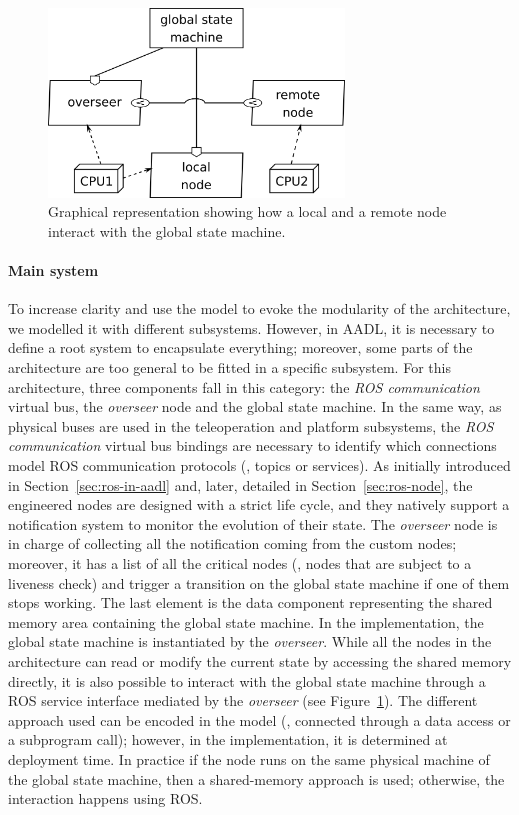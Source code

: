 \begin{figure}[t]
\centering
\includegraphics[width=0.7\textwidth]{gfx/pmk/overseer}
\caption{Graphical representation showing how a local and a remote node interact with the global state machine.}
\label{fig:pmk-gsm}
\end{figure}

\paragraph{Main system} To increase clarity and use the model to evoke the modularity of the architecture, we modelled it with different subsystems. However, in AADL, it is necessary to define a root system to encapsulate everything; moreover, some parts of the architecture are too general to be fitted in a specific subsystem. For this architecture, three components fall in this category: the \textit{ROS communication} virtual bus, the \textit{overseer} node and the global state machine. In the same way, as physical buses are used in the teleoperation and platform subsystems, the \textit{ROS communication} virtual bus bindings are necessary to identify which connections model ROS communication protocols (\ie, topics or services). As initially introduced in Section~\ref{sec:ros-in-aadl} and, later, detailed in Section~\ref{sec:ros-node}, the engineered nodes are designed with a strict life cycle, and they natively support a notification system to monitor the evolution of their state. The \textit{overseer} node is in charge of collecting all the notification coming from the custom nodes; moreover, it has a list of all the critical nodes (\ie, nodes that are subject to a liveness check) and trigger a transition on the global state machine if one of them stops working. The last element is the data component representing the shared memory area containing the global state machine. In the implementation, the global state machine is instantiated by the \textit{overseer}. While all the nodes in the architecture can read or modify the current state by accessing the shared memory directly, it is also possible to interact with the global state machine through a ROS service interface mediated by the \textit{overseer} (see Figure~\ref{fig:pmk-gsm}). The different approach used can be encoded in the model (\ie, connected through a data access or a subprogram call); however, in the implementation, it is determined at deployment time. In practice if the node runs on the same physical machine of the global state machine, then a shared-memory approach is used; otherwise, the interaction happens using ROS. 

